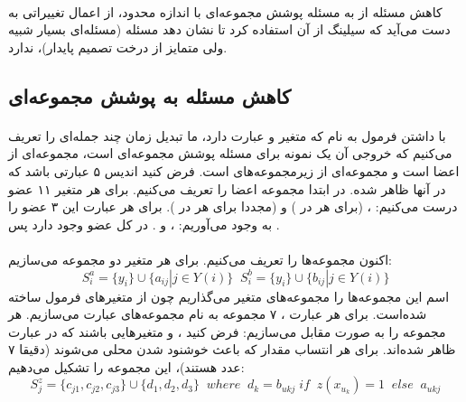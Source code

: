 \documentclass[a4paper]{article}
\begin{document}
	\paragraph{}
	کاهش مسئله از
	به مسئله پوشش مجموعه‌ای با اندازه محدود، از اعمال تغییراتی به دست می‌آید که سیلینگ از آن استفاده کرد تا نشان
	دهد مسئله
	(مسئله‌ای بسیار شبیه ولی متمایز از درخت تصمیم پایدار)، 
	ندارد.
	\subsection{کاهش مسئله 
	به پوشش مجموعه‌ای}
	\paragraph{}
	با داشتن فرمول
	به نام 
	\lr{$\phi$}
	که
	متغیر و 
	عبارت دارد، ما تبدیل زمان چند جمله‌ای 
	را تعریف می‌کنیم که خروجی آن یک نمونه
	برای مسئله پوشش مجموعه‌ای است، 
	مجموعه‌ای از اعضا است و 
	مجموعه‌ای از زیرمجموعه‌های 
	است. فرض کنید
	اندیس ۵ عبارتی باشد که در آنها
	ظاهر شده. در ابتدا مجموعه اعضا را تعریف می‌کنیم. برای هر متغیر
	۱۱ عضو درست می‌کنیم:
	،
	(برای هر 
	در
	)
	و
	(مجددا برای هر 
	در
	).
	برای هر عبارت
	این ۳ عضو را به وجود می‌آوریم:
	،
	و
	.
	در کل 
	عضو وجود دارد پس
	.
	\paragraph{}
	اکنون مجموعه‌ها را تعریف می‌کنیم. برای هر متغیر
	دو مجموعه می‌سازیم:
	\[S^{a}_{i} = \{y_i\} \cup \{a_{ij}| j \in Y(i) \} \; \; S^{b}_{i} = \{y_i\} \cup \{b_{ij}| j \in Y(i) \} \]
	اسم این مجموعه‌ها را مجموعه‌های متغیر می‌گذاریم چون از متغیرهای فرمول ساخته شده‌است. برای هر عبارت
	، ۷ مجموعه به نام مجموعه‌های عبارت می‌سازیم. هر مجموعه را به صورت مقابل می‌سازیم: فرض کنید
	،
	و
	متغیرهایی باشند که در عبارت
	ظاهر شده‌اند. برای هر انتساب مقدار 
	که باعث خوشنود شدن محلی می‌شوند (دقیقا ۷ عدد هستند)، این مجموعه را تشکیل می‌دهیم:
	\[S^{z}_{j} = \{c_{j1}, c_{j2}, c_{j3}\} \cup \{d_1, d_2, d_3\} \;\; where\;\; d_k = b_{ukj}\; if\;\; z(x_{u_k})=1 \;\; else\;\; a_{ukj} \]
\end{document}
